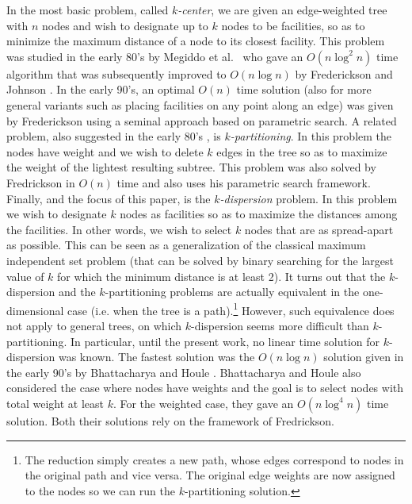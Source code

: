 \documentclass[11pt,a4paper]{article}
\newcommand{\Oh}{{O}}
\theoremstyle{definition}
\theoremstyle{remark}
\begin{document}
In the most basic problem, called \emph{$k$-center}, we are given an edge-weighted tree with $n$ nodes and wish to designate up to $k$ nodes to be facilities, so as to minimize the maximum distance of a node to its closest facility. This problem was studied in the early 80's by Megiddo et al.~\cite{Megiddo1981} who gave an $\Oh(n\log^2n)$ time algorithm that was subsequently improved to $\Oh(n\log n)$ by Frederickson and Johnson \cite{Frederickson1983}. In the early 90's, an optimal $\Oh(n)$ time solution (also for more general variants such as placing facilities on any point along an edge) was given by Frederickson \cite{Frederickson1991a} using a seminal approach based on parametric search. 
%
A related problem, also suggested in the early 80's  \cite{Becker1982,Perl1981}, is \emph{$k$-partitioning}. In this problem the nodes have weight and we wish to delete $k$ edges in the tree so as to maximize the weight of the lightest resulting subtree. This problem was also solved by Fredrickson in $\Oh(n)$ time \cite{Frederickson1991} and also uses his parametric search framework. 
%
Finally, and the focus of this paper, is the  {\em $k$-dispersion} problem. In this problem we wish to designate $k$ nodes as facilities so as to maximize the distances among the facilities.  In other words, we wish to select $k$ nodes that are as spread-apart as possible. This can be seen as a generalization of the classical maximum independent set problem (that can be solved by binary searching for the largest value of $k$ for which the minimum distance is at least 2).  
%
It turns out that the $k$-dispersion and the $k$-partitioning problems are actually equivalent in the one-dimensional case (i.e. when the tree is a path).\footnote{The reduction simply creates a new path, whose edges correspond to nodes in the original path and vice versa. The original edge weights are now assigned to the nodes so we can run the $k$-partitioning solution.} However, such equivalence does not apply to general trees, on which $k$-dispersion seems more difficult than $k$-partitioning. In particular, until the present work, no linear time solution for $k$-dispersion was known. The fastest solution was the $O(n \log n)$ solution given in the early 90's by Bhattacharya and Houle \cite{Bhattacharya1991}. Bhattacharya and Houle also considered the case where nodes have weights and the goal is to select nodes with total weight at least $k$. For the weighted case, they gave an $\Oh(n\log^4 n)$ time solution. Both their solutions rely on the framework of Fredrickson.
\end{document}
